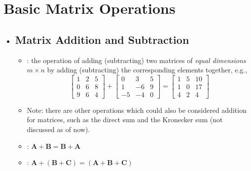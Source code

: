 \section{Basic Matrix Operations}\label{Basic Matrix Operations}
\begin{itemize}
  \item []
  
  \subsection{Matrix Addition and Subtraction}\label{Matrix Addition and Subtraction}
  \begin{itemize}
    \item {}: the operation of adding (subtracting) two matrices of \emph{equal dimensions} \(m \times n\) by adding (subtracting) the corresponding elements together, e.g.,
    \[%
    \begin{bmatrix}
    1 & 2 & 5 \\
    0 & 6 & 8 \\
    9 & 6 & 4 
    \end{bmatrix} +
    \begin{bmatrix}
      0 & 3 & 5 \\
      1 & -6 & 9 \\
      -5 & -4 & 0 
    \end{bmatrix} 
    = 
    \begin{bmatrix}
    1 & 5 & 10 \\
    1 & 0 & 17 \\
    4 & 2 & 4 
    \end{bmatrix}
    \]%
    \item Note: there are other operations which could also be considered addition for matrices, such as the direct sum and the Kronecker sum (not discussed as of now).
    \item {}: \(\bm{A}+\bm{B} = \bm{B} + \bm{A}\)
    \item {}: \(\bm{A} + (\bm{B}+\bm{C}) = (\bm{A}+\bm{B}+ \bm{C})\)
  \end{itemize}


\end{itemize}
